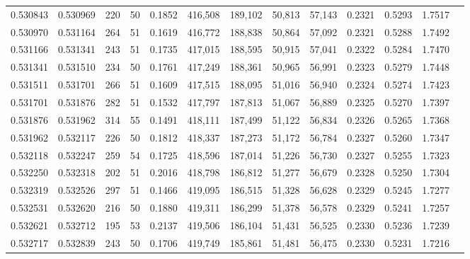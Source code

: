 \begin{tabular}{rrrrrrrrrrrrr}
0.530843 & 0.530969 &   220 &  50 &                                     0.1852 & 416,508 & 189,102 &  50,813 &  57,143 & 0.2321 & 0.5293 & 1.7517 \\
0.530970 & 0.531164 &   264 &  51 &                                     0.1619 & 416,772 & 188,838 &  50,864 &  57,092 & 0.2321 & 0.5288 & 1.7492 \\
0.531166 & 0.531341 &   243 &  51 &                                     0.1735 & 417,015 & 188,595 &  50,915 &  57,041 & 0.2322 & 0.5284 & 1.7470 \\
0.531341 & 0.531510 &   234 &  50 &                                     0.1761 & 417,249 & 188,361 &  50,965 &  56,991 & 0.2323 & 0.5279 & 1.7448 \\
0.531511 & 0.531701 &   266 &  51 &                                     0.1609 & 417,515 & 188,095 &  51,016 &  56,940 & 0.2324 & 0.5274 & 1.7423 \\
0.531701 & 0.531876 &   282 &  51 &                                     0.1532 & 417,797 & 187,813 &  51,067 &  56,889 & 0.2325 & 0.5270 & 1.7397 \\
0.531876 & 0.531962 &   314 &  55 &                                     0.1491 & 418,111 & 187,499 &  51,122 &  56,834 & 0.2326 & 0.5265 & 1.7368 \\
0.531962 & 0.532117 &   226 &  50 &                                     0.1812 & 418,337 & 187,273 &  51,172 &  56,784 & 0.2327 & 0.5260 & 1.7347 \\
0.532118 & 0.532247 &   259 &  54 &                                     0.1725 & 418,596 & 187,014 &  51,226 &  56,730 & 0.2327 & 0.5255 & 1.7323 \\
0.532250 & 0.532318 &   202 &  51 &                                     0.2016 & 418,798 & 186,812 &  51,277 &  56,679 & 0.2328 & 0.5250 & 1.7304 \\
0.532319 & 0.532526 &   297 &  51 &                                     0.1466 & 419,095 & 186,515 &  51,328 &  56,628 & 0.2329 & 0.5245 & 1.7277 \\
0.532531 & 0.532620 &   216 &  50 &                                     0.1880 & 419,311 & 186,299 &  51,378 &  56,578 & 0.2329 & 0.5241 & 1.7257 \\
0.532621 & 0.532712 &   195 &  53 &                                     0.2137 & 419,506 & 186,104 &  51,431 &  56,525 & 0.2330 & 0.5236 & 1.7239 \\
0.532717 & 0.532839 &   243 &  50 &                                     0.1706 & 419,749 & 185,861 &  51,481 &  56,475 & 0.2330 & 0.5231 & 1.7216 \\

\end{tabular}
